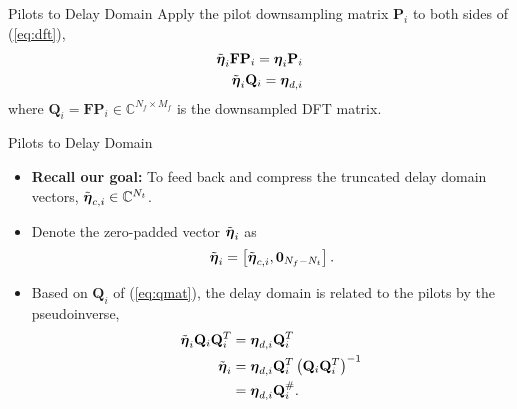 \documentclass{beamer}
\begin{document}
  \begin{frame}{Pilots to Delay Domain}
    Apply the pilot downsampling matrix $\mathbf{P}_i$ to both sides of (\ref{eq:dft}),
    \begin{align}
      \tilde{\boldsymbol{\eta}}_{i}\mathbf{F}\mathbf{P}_i = \boldsymbol{\eta}_i\mathbf{P}_i \nonumber \\
      \tilde{\boldsymbol{\eta}}_{i}\mathbf{Q}_i = \boldsymbol{\eta}_{d,i} \label{eq:qmat}
    \end{align}
    where $\mathbf{Q}_i=\mathbf{F}\mathbf{P}_i\in\mathbb{C}^{N_f\times M_f}$ is the downsampled DFT matrix.
  \end{frame}

  \begin{frame}{Pilots to Delay Domain}
    \begin{itemize}    
      \item \textbf{Recall our goal:} To feed back and compress the truncated delay domain vectors, $\tilde{\boldsymbol{\eta}}_{c,i}\in\mathbb{C}^{N_t}$.
      \item Denote the zero-padded vector $\tilde{\boldsymbol{\eta}}_{i}$ as
      \begin{align} 
        \tilde{\boldsymbol{\eta}}_{i} = \left[\tilde{\boldsymbol{\eta}}_{c,i}, \mathbf{0}_{N_f - N_t}\right]. \label{eq:p2d_short}
      \end{align}
      \item Based on $\mathbf{Q}_i$ of (\ref{eq:qmat}), the delay domain is related to the pilots by the pseudoinverse,
      \begin{align}
        \tilde{\boldsymbol{\eta}}_{i}\mathbf{Q}_i\mathbf{Q}_i^T &= \boldsymbol{\eta}_{d,i}\mathbf{Q}_i^T \nonumber \\
        \tilde{\boldsymbol{\eta}}_{i} &= \boldsymbol{\eta}_{d,i}\mathbf{Q}_i^T\left(\mathbf{Q}_i\mathbf{Q}_i^T\right)^{-1} \nonumber \\
        &= \boldsymbol{\eta}_{d,i}\mathbf{Q}_i^{\#}. \label{eq:p2d}
      \end{align}
    \end{itemize}
  \end{frame}
\end{document}
